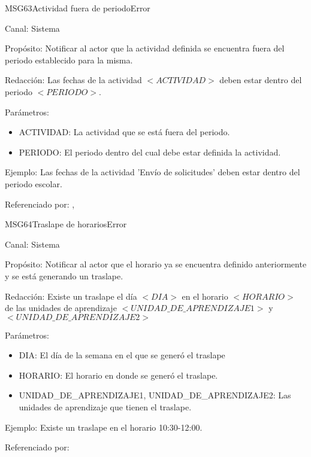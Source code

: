 \begin{mensaje}{MSG63}{Actividad fuera de periodo}{Error}
	\item[Canal:] Sistema
	\item[Propósito:] Notificar al actor que la actividad definida se encuentra fuera del periodo establecido para la misma.
	\item[Redacción:] Las fechas de la actividad $<ACTIVIDAD>$ deben estar dentro del periodo $<PERIODO>$.
	\item[Parámetros:] 
	\begin{itemize}
		\item ACTIVIDAD: La actividad que se está fuera del periodo.
		\item PERIODO: El periodo dentro del cual debe estar definida la actividad.
	\end{itemize}
	\item[Ejemplo:] Las fechas de la actividad 'Envío de solicitudes' deben estar dentro del periodo escolar.
	\item[Referenciado por: ] , 
\end{mensaje}

\begin{mensaje}{MSG64}{Traslape de horarios}{Error}
	\item[Canal:] Sistema
	\item[Propósito:] Notificar al actor que el horario ya se encuentra definido anteriormente y se está generando un traslape.
	\item[Redacción:] Existe un traslape el día $<DIA>$ en el horario $<HORARIO>$ de las unidades de aprendizaje $<UNIDAD\_DE\_APRENDIZAJE1>$ y $<UNIDAD\_DE\_APRENDIZAJE2>$
	\item[Parámetros:] \cdtEmpty
	\begin{itemize}
		\item DIA: El día de la semana en el que se generó el traslape
		\item HORARIO: El horario en donde se generó el traslape.
		\item UNIDAD\_DE\_APRENDIZAJE1, UNIDAD\_DE\_APRENDIZAJE2: Las unidades de aprendizaje que tienen el traslape.
	\end{itemize}
	\item[Ejemplo:] Existe un traslape en el horario 10:30-12:00.
	\item[Referenciado por: ] 
\end{mensaje}

